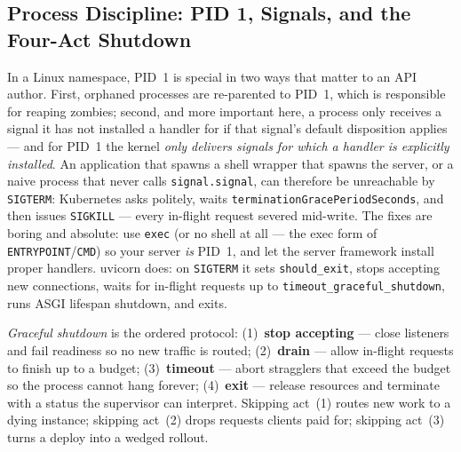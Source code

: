 \subsection{Process Discipline: PID 1, Signals, and the Four-Act Shutdown}
\label{sec:ch17-process}

In a Linux namespace, PID~1 is special in two ways that matter to an API
author. First, orphaned processes are re-parented to PID~1, which is
responsible for reaping zombies; second, and more important here, a
process only receives a signal it has not installed a handler for if that
signal's default disposition applies --- and for PID~1 the kernel
\emph{only delivers signals for which a handler is explicitly installed}.
An application that spawns a shell wrapper that spawns the server, or a
naive process that never calls \texttt{signal.signal}, can therefore be
unreachable by \texttt{SIGTERM}: Kubernetes asks politely, waits
\texttt{terminationGracePeriodSeconds}, and then issues
\texttt{SIGKILL} --- every in-flight request severed mid-write. The fixes
are boring and absolute: use \texttt{exec} (or no shell at all --- the
exec form of \texttt{ENTRYPOINT}/\texttt{CMD}) so your server \emph{is}
PID~1, and let the server framework install proper handlers. uvicorn
does: on \texttt{SIGTERM} it sets \texttt{should\_exit}, stops accepting
new connections, waits for in-flight requests up to
\texttt{timeout\_graceful\_shutdown}, runs ASGI lifespan shutdown, and
exits.

\begin{definition}
\emph{Graceful shutdown} is the ordered protocol: (1)~\textbf{stop
accepting} --- close listeners and fail readiness so no new traffic is
routed; (2)~\textbf{drain} --- allow in-flight requests to finish up to a
budget; (3)~\textbf{timeout} --- abort stragglers that exceed the budget
so the process cannot hang forever; (4)~\textbf{exit} --- release
resources and terminate with a status the supervisor can interpret.
Skipping act~(1) routes new work to a dying instance; skipping act~(2)
drops requests clients paid for; skipping act~(3) turns a deploy into a
wedged rollout.
\end{definition}

